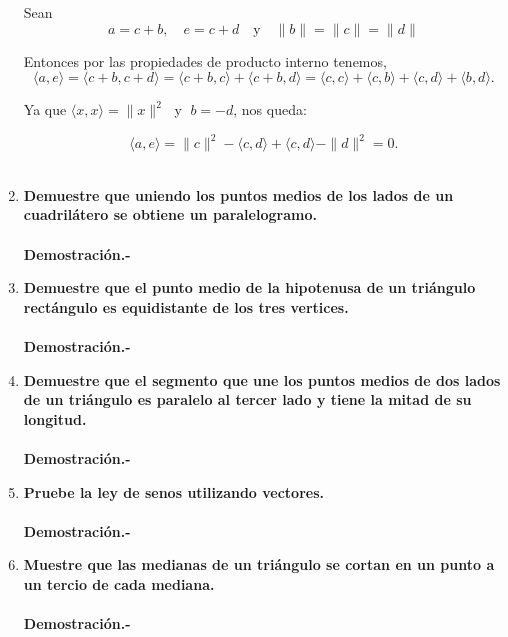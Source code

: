 \begin{enumerate}
	Sean
	$$a=c+b, \quad  e=c+d \quad \mbox{y}\quad \|b\|=\|c\|=\|d\|$$

	Entonces por las propiedades de producto interno tenemos,
	$$\langle a,e\rangle = \langle c+b,c+d\rangle =\langle c+b, c\rangle + \langle c+b, d\rangle = \langle c,c \rangle +\langle c,b\rangle +\langle c,d\rangle +\langle b,d \rangle.$$

    	Ya que $\langle x,x \rangle = \|x\|^2\;$ y $\; b=-d$, nos queda:

	$$\langle a,e\rangle = \|c\|^2 -\langle c,d\rangle +\langle c,d\rangle -\|d\|^2 = 0.$$\\


    \item \textbf{\boldmath Demuestre que uniendo los puntos medios de los lados de un cuadrilátero se obtiene un paralelogramo.\\\\
	Demostración.-}\;

    \item \textbf{\boldmath Demuestre que el punto medio de la hipotenusa de un triángulo rectángulo es equidistante de los tres vertices.\\\\
	Demostración.-}\;

    \item \textbf{\boldmath Demuestre que el segmento que une los puntos medios de dos lados de un triángulo es paralelo al tercer lado y tiene la mitad de su longitud.\\\\
	Demostración.-}\;

    \item \textbf{\boldmath Pruebe la ley de senos utilizando vectores.\\\\
	Demostración.-}\; 

    \item \textbf{\boldmath Muestre que las medianas de un triángulo se cortan en un punto a un tercio de cada mediana.\\\\
	Demostración.-}\;


\end{enumerate}
